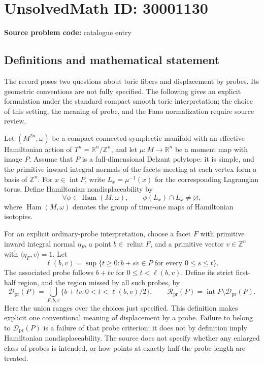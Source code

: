 \documentclass[11pt]{article}
\newcommand{\Z}{\mathbb{Z}}
\newcommand{\R}{\mathbb{R}}
\begin{document}
\section*{UnsolvedMath ID: 30001130}
\textbf{Source problem code:} catalogue entry
\subsection{Definitions and mathematical statement}
The record poses two questions about toric fibers and displacement by probes. Its geometric conventions are not fully specified. The following gives an explicit formulation under the standard compact smooth toric interpretation; the choice of this setting, the meaning of probe, and the Fano normalization require source review.

Let \((M^{2n},\omega)\) be a compact connected symplectic manifold with an effective Hamiltonian action of \(T^n=\R^n/\Z^n\), and let \(\mu:M\to\R^n\) be a moment map with image \(P\). Assume that \(P\) is a full-dimensional Delzant polytope: it is simple, and the primitive inward integral normals of the facets meeting at each vertex form a basis of \(\Z^n\). For \(x\in\operatorname{int}P\), write \(L_x=\mu^{-1}(x)\) for the corresponding Lagrangian torus. Define Hamiltonian nondisplaceability by
\[
 \forall\phi\in\operatorname{Ham}(M,\omega),\qquad
 \phi(L_x)\cap L_x\ne\varnothing,
\]
where \(\operatorname{Ham}(M,\omega)\) denotes the group of time-one maps of Hamiltonian isotopies.

For an explicit ordinary-probe interpretation, choose a facet \(F\) with primitive inward integral normal \(\eta_F\), a point \(b\in\operatorname{relint}F\), and a primitive vector \(v\in\Z^n\) with \(\langle\eta_F,v\rangle=1\). Let
\[
 \ell(b,v)=\sup\{t\geq0:b+sv\in P\text{ for every }0\leq s\leq t\}.
\]
The associated probe follows \(b+tv\) for \(0\leq t<\ell(b,v)\). Define its strict first-half region, and the region missed by all such probes, by
\[
 \mathcal D_{\mathrm{pr}}(P)
 =\bigcup_{F,b,v}\{b+tv:0<t<\ell(b,v)/2\},
 \qquad
 \mathcal R_{\mathrm{pr}}(P)
 =\operatorname{int}P\setminus\mathcal D_{\mathrm{pr}}(P).
\]
Here the union ranges over the choices just specified. This definition makes explicit one conventional meaning of displacement by a probe. Failure to belong to \(\mathcal D_{\mathrm{pr}}(P)\) is a failure of that probe criterion; it does not by definition imply Hamiltonian nondisplaceability. The source does not specify whether any enlarged class of probes is intended, or how points at exactly half the probe length are treated.
\end{document}
